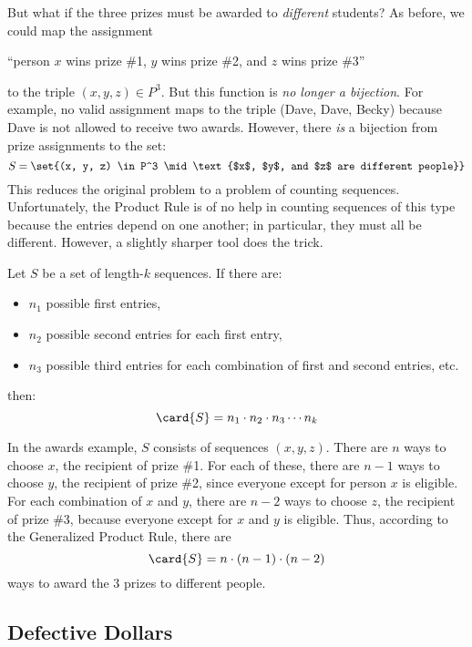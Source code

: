 But what if the three prizes must be awarded to \emph{different}
students?  As before, we could map the assignment
%
\begin{center}
``person $x$ wins prize \#1, $y$ wins prize \#2, and $z$ wins prize \#3''
\end{center}
%
to the triple $(x, y, z) \in P^3$.  But this function is \emph{no longer
a bijection}.  For example, no valid assignment maps to the triple (Dave,
Dave, Becky) because Dave is not allowed to receive two awards.  However,
there \emph{is} a bijection from prize assignments to the set:
%
\[
S = \set{(x, y, z) \in P^3 \mid \text{$x$, $y$, and $z$ are different people}}
\]
%
This reduces the original problem to a problem of counting sequences.
Unfortunately, the Product Rule is of no help in counting sequences of
this type because the entries depend on one another; in particular,
they must all be different.  However, a slightly sharper tool does the
trick.

\begin{mathrule}
Let $S$ be a set of length-$k$ sequences.  If there are:
%
\begin{itemize}
\item $n_1$ possible first entries,
\item $n_2$ possible second entries for each first entry,
\item $n_3$ possible third entries for each combination of first and
second entries, etc.
\end{itemize}
%
then:
%
\[
\card{S} = n_1 \cdot n_2 \cdot n_3 \cdots n_k
\]
\end{mathrule}

In the awards example, $S$ consists of sequences $(x, y, z)$.  There
are $n$ ways to choose $x$, the recipient of prize \#1.  For each of
these, there are $n-1$ ways to choose $y$, the recipient of prize \#2,
since everyone except for person $x$ is eligible.  For each
combination of $x$ and $y$, there are $n-2$ ways to choose $z$, the
recipient of prize \#3, because everyone except for $x$ and $y$ is
eligible.  Thus, according to the Generalized Product Rule, there are
%
\[
\card{S} = n \cdot (n-1) \cdot (n-2)
\]
%
ways to award the 3 prizes to different people.

\subsection{Defective Dollars}

